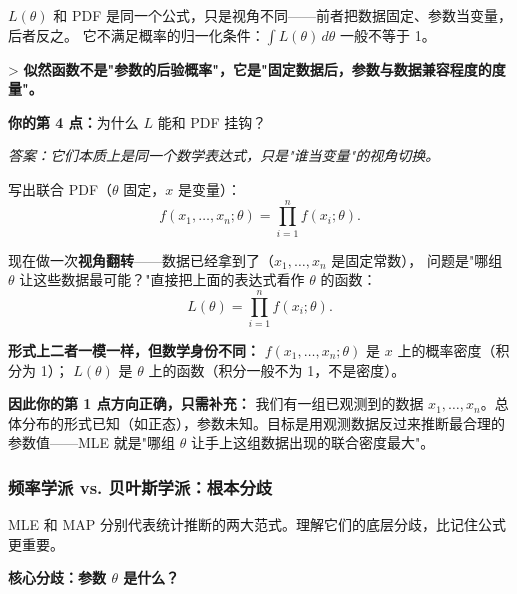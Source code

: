 $L(\theta)$ 和 PDF 是同一个公式，只是视角不同——前者把数据固定、参数当变量，后者反之。
它不满足概率的归一化条件：$\int L(\theta)\,d\theta$ 一般不等于 1。

> \textbf{似然函数不是"参数的后验概率"，它是"固定数据后，参数与数据兼容程度的度量"。}

\medskip
\textbf{你的第 4 点：}为什么 $L$ 能和 PDF 挂钩？

\emph{答案：它们本质上是同一个数学表达式，只是"谁当变量"的视角切换。}

写出联合 PDF（$\theta$ 固定，$x$ 是变量）：
\begin{equation}
    f(x_1, \dots, x_n; \theta) = \prod_{i=1}^{n} f(x_i; \theta).
\end{equation}

现在做一次\textbf{视角翻转}——数据已经拿到了（$x_1,\dots,x_n$ 是固定常数），
问题是"哪组 $\theta$ 让这些数据最可能？"直接把上面的表达式看作 $\theta$ 的函数：
\begin{equation}
    L(\theta) = \prod_{i=1}^{n} f(x_i; \theta).
\end{equation}

\textbf{形式上二者一模一样，但数学身份不同：}
$f(x_1,\dots,x_n; \theta)$ 是 $x$ 上的概率密度（积分为 1）；
$L(\theta)$ 是 $\theta$ 上的函数（积分一般不为 1，不是密度）。

\begin{center}
\end{center}

\textbf{因此你的第 1 点方向正确，只需补充：}
我们有一组已观测到的数据 $x_1,\dots,x_n$。总体分布的形式已知（如正态），参数未知。目标是用观测数据反过来推断最合理的参数值——MLE 就是"哪组 $\theta$ 让手上这组数据出现的联合密度最大"。

\subsubsection{频率学派 vs. 贝叶斯学派：根本分歧}

MLE 和 MAP 分别代表统计推断的两大范式。理解它们的底层分歧，比记住公式更重要。

\medskip
\textbf{核心分歧：参数 $\theta$ 是什么？}

